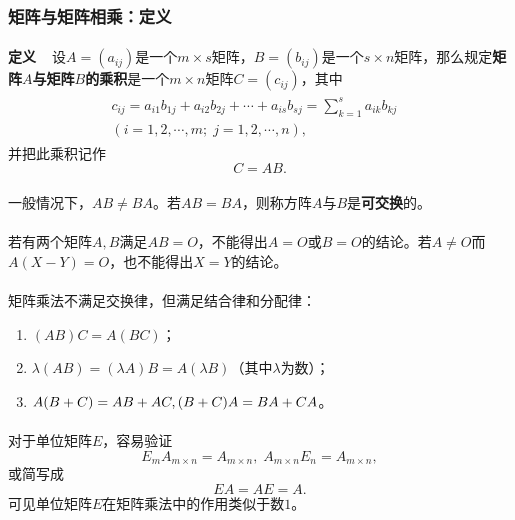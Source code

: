 \subsubsection{矩阵与矩阵相乘：定义}
\paragraph{}
\textbf{定义~~}设$A=(a_{ij})$是一个$m\times s$矩阵，$B=(b_{ij})$是一个$s\times n$矩阵，那么规定\textbf{矩阵$A$与矩阵$B$的乘积}是一个$m\times n$矩阵$C=(c_{ij})$，其中
\begin{align}
\begin{split}
  c_{ij} = a_{i1}b_{1j} + a_{i2}b_{2j} + \cdots + a_{is}b_{sj} = \sum_{k=1}^sa_{ik}b_{kj} &\\
  (i = 1,2,\cdots,m; \; j = 1,2,\cdots, n),&
\end{split}
\end{align}
并把此乘积记作
\begin{equation*}
  C=AB.
\end{equation*}

\paragraph{}
一般情况下，$AB\neq BA$。若$AB = BA$，则称方阵$A$与$B$是\textbf{可交换}的。

\paragraph{}
若有两个矩阵$A,B$满足$AB=O$，不能得出$A=O$或$B=O$的结论。若$A\neq O$而$A(X-Y)=O$，也不能得出$X=Y$的结论。

\paragraph{}
矩阵乘法不满足交换律，但满足结合律和分配律：
\begin{enumerate}
  \item $(AB)C = A(BC)$；
  \item $\lambda(AB) = (\lambda A)B = A(\lambda B)$（其中$\lambda$为数）；
  \item $A(B+C) = AB + AC,\\(B+C)A = BA+CA$。
\end{enumerate}

\paragraph{}
对于单位矩阵$E$，容易验证
\begin{equation*}
  E_mA_{m\times n} = A_{m\times n}, \; A_{m\times n}E_n = A_{m\times n},
\end{equation*}
或简写成
\begin{equation*}
  EA=AE=A.
\end{equation*}
可见单位矩阵$E$在矩阵乘法中的作用类似于数$1$。

